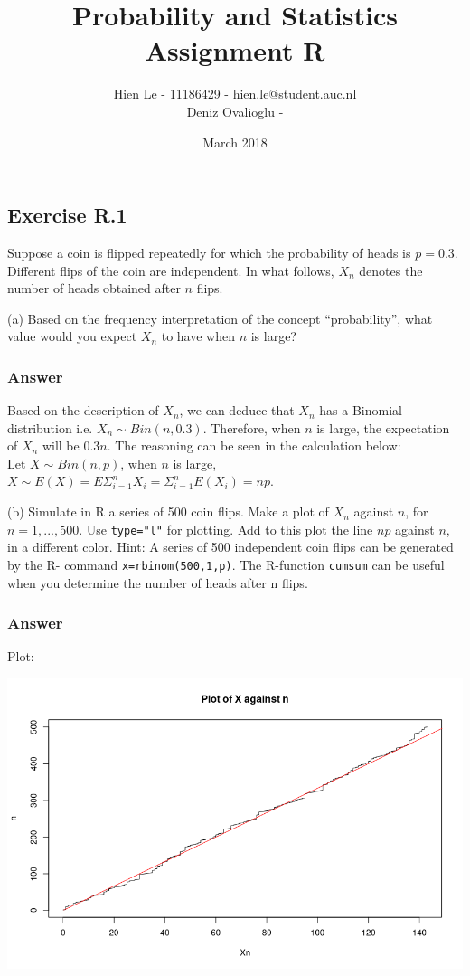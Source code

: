 \documentclass[12pt]{article}
\title{Probability and Statistics \\ Assignment R}
\author{Hien Le - 11186429 - hien.le@student.auc.nl \\ Deniz Ovalioglu - }
\date{March 2018}
\begin{document}
\maketitle

\subsection*{Exercise R.1}
Suppose a coin is flipped repeatedly for which the probability of
heads is $p = 0.3$. Different flips of the coin are independent. In what follows, $X_{n}$ denotes the number of heads obtained after $n$ flips.

(a) Based on the frequency interpretation of the concept “probability”, what value would you expect $X_{n}$ to have when $n$ is large?
\subsubsection*{Answer}
Based on the description of $X_{n}$, we can deduce that $X_{n}$ has a Binomial distribution i.e. $X_{n} \sim Bin(n, 0.3)$. Therefore, when $n$ is large, the expectation of $X_{n}$ will be 0.3$n$. The reasoning can be seen in the calculation below:\\
Let $X \sim Bin(n,p)$, when $n$ is large, $X \sim E(X) = E\Sigma^{n}_{i=1}X_{i} = \Sigma^{n}_{i=1}E(X_{i}) = np$.

(b) Simulate in R a series of 500 coin flips. Make a plot of $X_{n}$ against $n$, for $n = 1, . . . , 500$. Use \texttt{type="l"} for plotting. Add to this plot the line $np$ against $n$, in a different color.
Hint: A series of 500 independent coin flips can be generated by the R-
command \texttt{x=rbinom(500,1,p)}. The R-function \texttt{cumsum} can be useful when you determine the number of heads after n flips.
\subsubsection*{Answer}
Plot:

\includegraphics[width=\textwidth]{Ex1Plot1}
\end{document}
